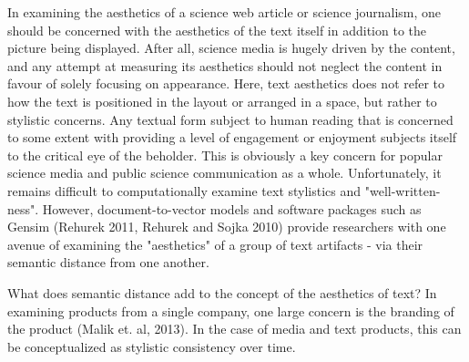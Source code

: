 \documentclass[letterpaper,12pt]{article}
\theoremstyle{definition}
\begin{document}
In examining the aesthetics of a science web article or science journalism, one should be concerned with the aesthetics of the text itself in addition to the picture being displayed. After all, science media is hugely driven by the content, and any attempt at measuring its aesthetics should not neglect the content in favour of solely focusing on appearance. Here, text aesthetics does not refer to how the text is positioned in the layout or arranged in a space, but rather to stylistic concerns. Any textual form subject to human reading that is concerned to some extent with providing a level of engagement or enjoyment subjects itself to the critical eye of the beholder. This is obviously a key concern for popular science media and public science communication as a whole. Unfortunately, it remains difficult to computationally examine text stylistics and "well-written-ness". However, document-to-vector models and software packages such as Gensim (Rehurek 2011, Rehurek and Sojka 2010) provide researchers with one avenue of examining the "aesthetics" of a group of text artifacts - via their semantic distance from one another.  

What does semantic distance add to the concept of the aesthetics of text? In examining products from a single company, one large concern is the branding of the product (Malik et. al, 2013). In the case of media and text products, this can be conceptualized as stylistic consistency over time. 
\\ 
  
\end{document}
